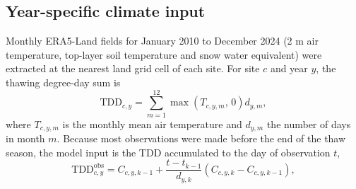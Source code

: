 


\subsection{Year-specific climate input}
Monthly ERA5-Land fields for January 2010 to December 2024\cite{munozsabater2021_era5_land} (2 m air temperature, top-layer soil temperature and snow water equivalent) were extracted at the nearest land grid cell of each site. For site $c$ and year $y$, the thawing degree-day sum\cite{Nelson1997,Riseborough2008} is
\begin{equation}
\mathrm{TDD}_{c,y} = \sum_{m=1}^{12} \max\!\left(T_{c,y,m},\,0\right) d_{y,m},
\label{eq:tdd}
\end{equation}
where $T_{c,y,m}$ is the monthly mean air temperature and $d_{y,m}$ the number of days in month $m$. Because most observations were made before the end of the thaw season, the model input is the TDD accumulated to the day of observation $t$,
\begin{equation}
\mathrm{TDD}^{\mathrm{obs}}_{c,y} = C_{c,y,k-1} + \frac{t - t_{k-1}}{d_{y,k}} \left( C_{c,y,k} - C_{c,y,k-1} \right),
\label{eq:tddobs}
\end{equation}
